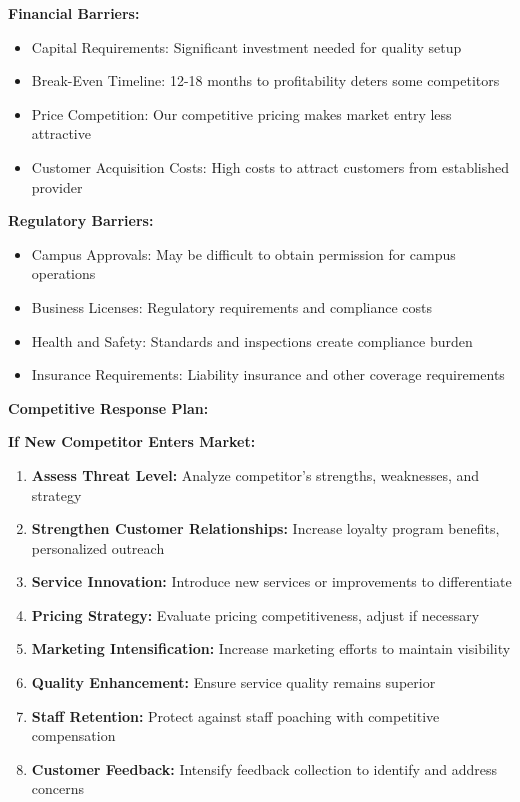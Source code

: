 \documentclass[a4paper,12pt]{article}
\begin{document}
\textbf{Financial Barriers:}
\begin{itemize}[leftmargin=2em]
    \item Capital Requirements: Significant investment needed for quality setup
    \item Break-Even Timeline: 12-18 months to profitability deters some competitors
    \item Price Competition: Our competitive pricing makes market entry less attractive
    \item Customer Acquisition Costs: High costs to attract customers from established provider
\end{itemize}

\textbf{Regulatory Barriers:}
\begin{itemize}[leftmargin=2em]
    \item Campus Approvals: May be difficult to obtain permission for campus operations
    \item Business Licenses: Regulatory requirements and compliance costs
    \item Health and Safety: Standards and inspections create compliance burden
    \item Insurance Requirements: Liability insurance and other coverage requirements
\end{itemize}

\vspace{1em}

\textbf{Competitive Response Plan:}

\textbf{If New Competitor Enters Market:}
\begin{enumerate}[leftmargin=2em]
    \item \textbf{Assess Threat Level:} Analyze competitor's strengths, weaknesses, and strategy
    \item \textbf{Strengthen Customer Relationships:} Increase loyalty program benefits, personalized outreach
    \item \textbf{Service Innovation:} Introduce new services or improvements to differentiate
    \item \textbf{Pricing Strategy:} Evaluate pricing competitiveness, adjust if necessary
    \item \textbf{Marketing Intensification:} Increase marketing efforts to maintain visibility
    \item \textbf{Quality Enhancement:} Ensure service quality remains superior
    \item \textbf{Staff Retention:} Protect against staff poaching with competitive compensation
    \item \textbf{Customer Feedback:} Intensify feedback collection to identify and address concerns
\end{enumerate}
\end{document}
